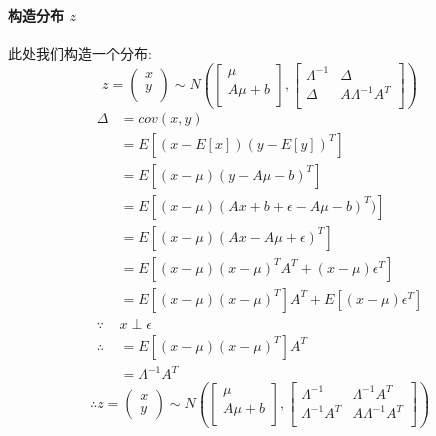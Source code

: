 \documentclass{report}
\begin{document}
\paragraph{构造分布 $z$\\}
此处我们构造一个分布:
$$
z = 
\left (
\begin{matrix}
x\\
y\\
\end{matrix}
\right )
\sim N(
\left [
\begin{matrix}
\mu\\
A\mu+b\\
\end{matrix}
\right ],
\left [
\begin{matrix}
\Lambda^{-1}&\Delta\\
\Delta&A\Lambda^{-1} A^T\\
\end{matrix}
\right ]
)
$$
$$
\begin{aligned}
\Delta
&=cov(x,y)\\
&=E[(x-E[x])(y-E[y])^T]\\
&=E[(x-\mu)(y-A\mu - b)^T]\\
&=E[(x-\mu)(Ax+b+ \epsilon -A\mu -b)^T)]\\
&=E[(x-\mu)(Ax-A\mu + \epsilon)^T]\\
&=E[(x-\mu)(x-\mu)^T A^T + (x-\mu)\epsilon^T]\\
&=E[(x-\mu)(x-\mu)^T]A^T + E[(x-\mu)\epsilon^T] \\
\because &x \perp \epsilon\\
\therefore &=E[(x-\mu)(x-\mu)^T]A^T\\
&=\Lambda^{-1}A^T
\end{aligned}
$$
$$
\therefore z=
\left ( \begin{matrix}
x\\y
\end{matrix} \right )
\sim N(
\left [
\begin{matrix}
\mu\\
A\mu+b\\
\end{matrix}
\right ],
\left [
\begin{matrix}
\Lambda^{-1}&\Lambda^{-1}A^T\\
\Lambda^{-1}A^T&A\Lambda^{-1} A^T\\
\end{matrix}
\right ]
)
$$
\end{document}

